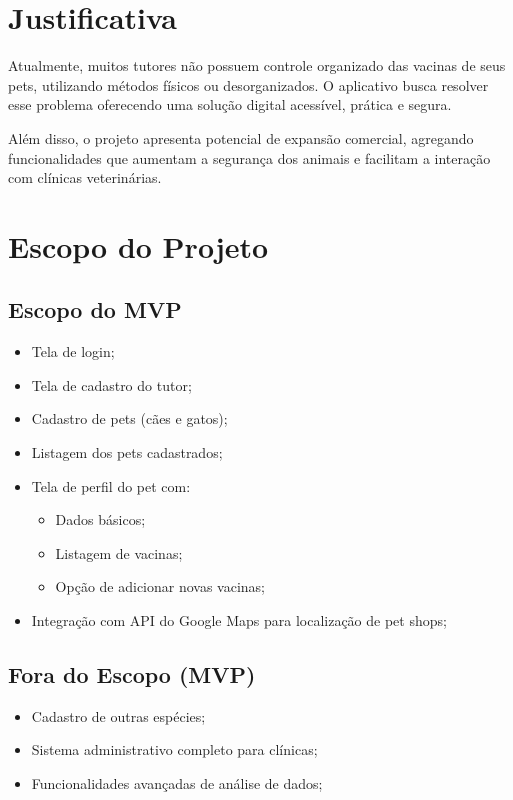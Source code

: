 \documentclass[12pt,a4paper]{article}
\begin{document}
\section{Justificativa}
Atualmente, muitos tutores não possuem controle organizado das vacinas de seus pets, utilizando métodos físicos ou desorganizados. O aplicativo busca resolver esse problema oferecendo uma solução digital acessível, prática e segura.

Além disso, o projeto apresenta potencial de expansão comercial, agregando funcionalidades que aumentam a segurança dos animais e facilitam a interação com clínicas veterinárias.

\section{Escopo do Projeto}

\subsection{Escopo do MVP}
\begin{itemize}
    \item Tela de login;
    \item Tela de cadastro do tutor;
    \item Cadastro de pets (cães e gatos);
    \item Listagem dos pets cadastrados;
    \item Tela de perfil do pet com:
    \begin{itemize}
        \item Dados básicos;
        \item Listagem de vacinas;
        \item Opção de adicionar novas vacinas;
    \end{itemize}
    \item Integração com API do Google Maps para localização de pet shops;
\end{itemize}

\subsection{Fora do Escopo (MVP)}
\begin{itemize}
    \item Cadastro de outras espécies;
    \item Sistema administrativo completo para clínicas;
    \item Funcionalidades avançadas de análise de dados;
\end{itemize}
\end{document}
